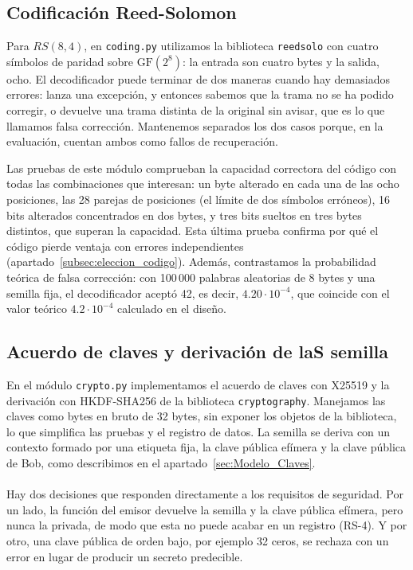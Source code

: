\documentclass[IB]{TFUOC}%
\begin{document}
\subsection{Codificación Reed-Solomon}
\label{subsec:impl_coding}

Para $RS(8,4)$, en \texttt{coding.py} utilizamos la biblioteca \texttt{reedsolo} con cuatro símbolos de paridad sobre $\mathrm{GF}(2^8)$: la entrada son cuatro bytes y la salida, ocho. El decodificador puede terminar de dos maneras cuando hay demasiados errores: lanza una excepción, y entonces sabemos que la trama no se ha podido corregir, o devuelve una trama distinta de la original sin avisar, que es lo que llamamos falsa corrección. Mantenemos separados los dos casos porque, en la evaluación, cuentan ambos como fallos de recuperación.

Las pruebas de este módulo comprueban la capacidad correctora del código con todas las combinaciones que interesan: un byte alterado en cada una de las ocho posiciones, las 28 parejas de posiciones (el límite de dos símbolos erróneos), 16 bits alterados concentrados en dos bytes, y tres bits sueltos en tres bytes distintos, que superan la capacidad. Esta última prueba confirma por qué el código pierde ventaja con errores independientes (apartado~\ref{subsec:eleccion_codigo}). Además, contrastamos la probabilidad teórica de falsa corrección: con 100\,000 palabras aleatorias de 8 bytes y una semilla fija, el decodificador aceptó 42, es decir, $4{.}20\cdot10^{-4}$, que coincide con el valor teórico $4{.}2\cdot10^{-4}$ calculado en el diseño.

\subsection{Acuerdo de claves y derivación de laS semilla}
\label{subsec:impl_crypto}

En el módulo \texttt{crypto.py} implementamos el acuerdo de claves con X25519 y la derivación con HKDF-SHA256 de la biblioteca \texttt{cryptography}. Manejamos las claves como bytes en bruto de 32 bytes, sin exponer los objetos de la biblioteca, lo que simplifica las pruebas y el registro de datos. La semilla se deriva con un contexto formado por una etiqueta fija, la clave pública efímera y la clave pública de Bob, como describimos en el apartado~\ref{sec:Modelo_Claves}.
\\
\\
Hay dos decisiones que responden directamente a los requisitos de seguridad. Por un lado, la función del 
emisor devuelve la semilla y la clave pública efímera, pero nunca la privada, de modo que esta no 
puede acabar en un registro (RS-4). Y por otro, una clave pública de orden bajo, por ejemplo 32 ceros, 
se rechaza con un error en lugar de producir un secreto predecible. 
\end{document}
